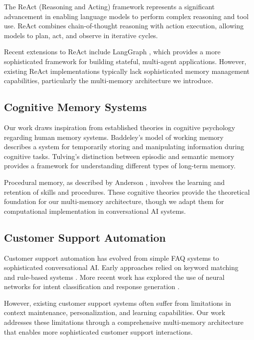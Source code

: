 \documentclass[11pt]{article}
\begin{document}
The ReAct (Reasoning and Acting) framework \cite{yao2022react} represents a significant advancement in enabling language models to perform complex reasoning and tool use. ReAct combines chain-of-thought reasoning with action execution, allowing models to plan, act, and observe in iterative cycles.

Recent extensions to ReAct include LangGraph \cite{langgraph2024}, which provides a more sophisticated framework for building stateful, multi-agent applications. However, existing ReAct implementations typically lack sophisticated memory management capabilities, particularly the multi-memory architecture we introduce.

\subsection{Cognitive Memory Systems}

Our work draws inspiration from established theories in cognitive psychology regarding human memory systems. Baddeley's model of working memory \cite{baddeley1992working} describes a system for temporarily storing and manipulating information during cognitive tasks. Tulving's distinction between episodic and semantic memory \cite{tulving1972episodic} provides a framework for understanding different types of long-term memory.

Procedural memory, as described by Anderson \cite{anderson1982skill}, involves the learning and retention of skills and procedures. These cognitive theories provide the theoretical foundation for our multi-memory architecture, though we adapt them for computational implementation in conversational AI systems.

\subsection{Customer Support Automation}

Customer support automation has evolved from simple FAQ systems to sophisticated conversational AI. Early approaches relied on keyword matching and rule-based systems \cite{jurafsky2009speech}. More recent work has explored the use of neural networks for intent classification and response generation \cite{chen2017enhanced}.

However, existing customer support systems often suffer from limitations in context maintenance, personalization, and learning capabilities. Our work addresses these limitations through a comprehensive multi-memory architecture that enables more sophisticated customer support interactions.
\end{document}

